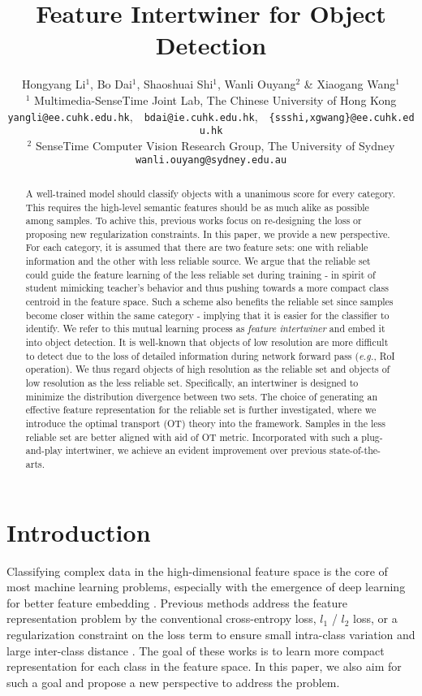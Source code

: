 \documentclass{article} \usepackage{iclr2019_conference,times}
\title{Feature Intertwiner for Object Detection}
\author{Hongyang Li$^{1}$, Bo Dai$^{1}$, Shaoshuai Shi$^{1}$, Wanli Ouyang$^{2}$ \& Xiaogang Wang$^{1}$
\\[1.5mm]
$^{1}$
Multimedia-SenseTime Joint Lab, The Chinese University of Hong Kong\\
\texttt{yangli@ee.cuhk.edu.hk},~~\texttt{bdai@ie.cuhk.edu.hk},~~\texttt{\{ssshi,xgwang\}@ee.cuhk.edu.hk}
\\[1mm]
$^{2}$ SenseTime Computer Vision Research Group, The University of Sydney\\
\texttt{wanli.ouyang@sydney.edu.au}
}
\begin{document}
\maketitle

\begin{abstract}
	A well-trained model should classify objects with a unanimous score for every category. This requires the high-level semantic features should be as much alike as possible among samples.
To achive this, previous works focus on re-designing the loss or proposing new regularization constraints.
In this paper, we provide a new perspective.
For each category, it is assumed that there are two feature sets:
one with reliable information and the other with less reliable source.
We argue that the reliable set could guide the feature learning of the less reliable set during training - in spirit of student mimicking teacher's behavior and thus pushing towards a more compact class centroid in the feature space. 
Such a scheme also benefits the reliable set since samples become closer within the same category - implying that it is easier for the classifier to identify. 
We refer to this mutual learning process as \textit{feature intertwiner} and embed it into object detection.
It is well-known that objects of low resolution are more difficult to detect due to the loss of detailed information during network forward pass (\textit{e.g.}, RoI operation). We thus regard objects of high resolution as the reliable set and objects of low resolution as the less reliable set. 
Specifically, an intertwiner is designed to minimize the distribution divergence between two sets. 
The choice of generating an effective feature representation for the reliable set 
is further investigated, where  
we introduce the optimal transport (OT) theory into the framework. Samples in the less reliable set are better aligned with aid of OT metric. 
Incorporated with such a plug-and-play intertwiner, we achieve an evident improvement over previous state-of-the-arts.


\end{abstract}

\section{Introduction}\label{sec:introduction}

Classifying complex data in the high-dimensional feature space is the core of most machine learning problems, especially with the emergence of deep learning for better feature embedding \citep{krizhevsky12_alexnet,he2016_resnet,li2018_capsule,li2019_cmt,guo2018learning} . Previous methods address the feature representation problem by the conventional cross-entropy loss, $l_1$ / $l_2$ loss, or a regularization constraint on the loss term to ensure small intra-class variation and large inter-class distance \citep{janocha2017_loss,liu2017_coco_v2,wen2016_center_loss,liu2017_spherical_loss}. The goal of these works is to learn more compact representation for each class in the feature space. 
In this paper, we also aim for such a goal and propose a new perspective to address the problem. 
\end{document}
